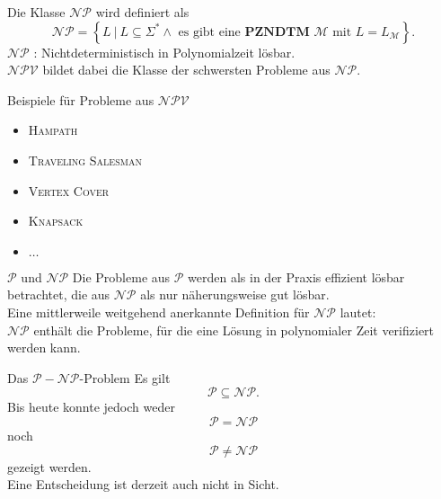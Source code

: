 \documentclass[]{beamer}
\begin{document}
\begin{frame}[squeeze]{}
  \begin{definition}
    Die Klasse $\mathcal{NP}$ wird definiert als
    \[\mathcal{NP} = \left\{L \ | \ L \subseteq \Sigma^* \wedge \text{ es gibt eine } \textbf{PZNDTM } \mathcal{M} \text{ mit } L = L_\mathcal{M} \right\}.\]
    $\mathcal{NP}$ : Nichtdeterministisch in Polynomialzeit lösbar. \\
    $\mathcal{NPV}$ bildet dabei die Klasse der schwersten Probleme aus $\mathcal{NP}$.
  \end{definition}
  
  \pause
  
  \begin{exampleblock}{Beispiele für Probleme aus $\mathcal{NPV}$}
    \begin{itemize}
      \item \textsc{Hampath}
      \item \textsc{Traveling Salesman}
      \item \textsc{Vertex Cover}
      \item \textsc{Knapsack}
      \item $\ldots$
    \end{itemize}
  \end{exampleblock}  
\end{frame}

\begin{frame}[squeeze]{}
  \begin{block}{$\mathcal{P}$ und $\mathcal{NP}$}
    Die Probleme aus $\mathcal{P}$ werden als in der Praxis effizient lösbar betrachtet, die aus $\mathcal{NP}$ als nur näherungsweise gut lösbar. \\
    \vspace*{1em}
    Eine mittlerweile weitgehend anerkannte Definition für $\mathcal{NP}$ lautet: \\
    $\mathcal{NP}$ enthält die Probleme, für die eine Lösung in polynomialer Zeit verifiziert werden kann.
  \end{block}
\end{frame}

\begin{frame}[<+->][squeeze]{}
  \begin{block}{Das $\mathcal{P-NP}$-Problem}
    Es gilt
    \[\mathcal{P} \subseteq \mathcal{NP}.\]
    Bis heute konnte jedoch weder
    \[\mathcal{P} = \mathcal{NP}\]
    noch
    \[\mathcal{P} \neq \mathcal{NP}\]
    gezeigt werden. \\
    \vspace*{1em}
    Eine Entscheidung ist derzeit auch nicht in Sicht.
  \end{block}
\end{frame}
\end{document}

